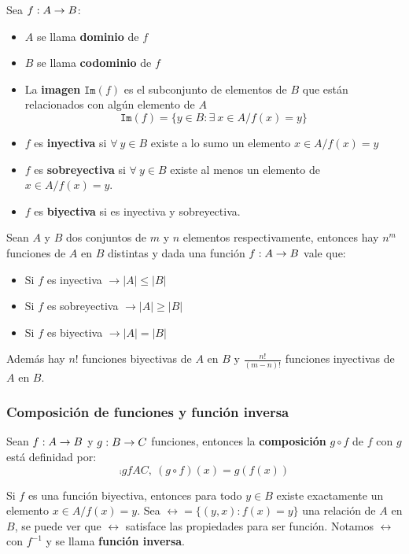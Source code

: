     Sea $f : A\rightarrow B$:
    \begin{itemize}
        \item $A$ se llama \textbf{dominio} de $f$
        \item $B$ se llama \textbf{codominio} de $f$
        \item La \textbf{imagen} $\texttt{Im}(f)$ es el subconjunto de elementos de $B$ que están relacionados con algún elemento de $A$
        \begin{equation*}
            \texttt{Im}(f) = \{y\in B : \exists~x\in A / f(x) = y\}
        \end{equation*}
        \item $f$ es \textbf{inyectiva} si $\forall~y\in B$ existe a lo sumo un elemento $x\in A / f(x) = y$
        \item $f$ es \textbf{sobreyectiva} si $\forall~y\in B$ existe al menos un elemento de $x\in A / f(x)=y$.
        \item $f$ es \textbf{biyectiva} si es inyectiva y sobreyectiva.
    \end{itemize}
    
     
    Sean $A$ y $B$ dos conjuntos de $m$ y $n$ elementos respectivamente, entonces hay $n^m$ funciones de $A$ en $B$ distintas y dada una función $f : A\rightarrow B$ vale que:
    \begin{itemize}
        \item Si $f$ es inyectiva $\to |A|\leq|B|$
        \item Si $f$ es sobreyectiva $\to|A|\geq|B|$
        \item Si $f$ es biyectiva $\to|A|=|B|$
    \end{itemize}
    
    Además hay $n!$ funciones biyectivas de $A$ en $B$ y $\frac{n!}{(m-n)!}$ funciones inyectivas de $A$ en $B$.
    
    \subsubsection{Composición de funciones y función inversa}
    Sean $f : A\rightarrow B$ y $g : B\rightarrow C$ funciones, entonces la \textbf{composición} $g\circ f$ de $f$ con $g$ está definidad por:
    \begin{equation*}
        \comp{g}{f}{A}{C},~(g\circ f)(x) =g(f(x))
    \end{equation*}

    Si $f$ es una función biyectiva, entonces para todo $y\in B$ existe exactamente un elemento $x\in A / f(x)=y$. Sea $\rel=\{(y,x) : f(x)=y\}$ una relación de $A$ en $B$, se puede ver que $\rel$ satisface las propiedades para ser función. Notamos $\rel$ con $f^{-1}$ y se llama \textbf{función inversa}.
    

